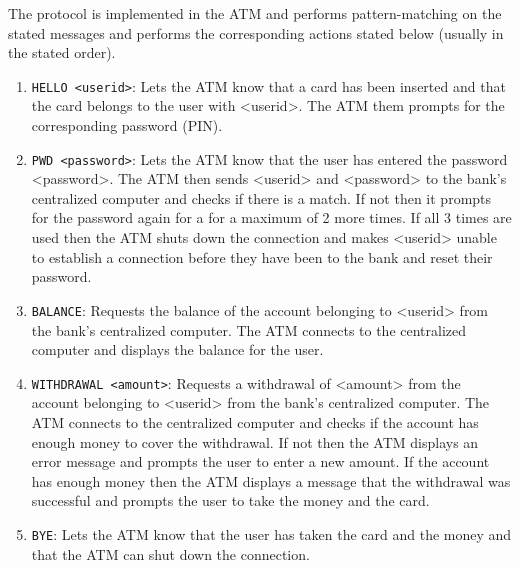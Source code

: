 The protocol is implemented in the ATM and performs pattern-matching on the stated messages and performs the corresponding actions stated below (usually in the stated order).
\begin{enumerate}
    \item \texttt{HELLO <userid>}: Lets the ATM know that a card has been inserted and that the card belongs to the user with <userid>. The ATM them prompts for the corresponding password (PIN).
    \item \texttt{PWD <password>}: Lets the ATM know that the user has entered the password <password>. The ATM then sends <userid> and <password> to the bank's centralized computer and checks if there is a match. If not then it prompts for the password again for a for a maximum of 2 more times. If all 3 times are used then the ATM shuts down the connection and makes <userid> unable to establish a connection before they have been to the bank and reset their password.
    \item \texttt{BALANCE}: Requests the balance of the account belonging to <userid> from the bank's centralized computer. The ATM connects to the centralized computer and displays the balance for the user.
    \item \texttt{WITHDRAWAL <amount>}: Requests a withdrawal of <amount> from the account belonging to <userid> from the bank's centralized computer. The ATM connects to the centralized computer and checks if the account has enough money to cover the withdrawal. If not then the ATM displays an error message and prompts the user to enter a new amount. If the account has enough money then the ATM displays a message that the withdrawal was successful and prompts the user to take the money and the card.
    \item \texttt{BYE}: Lets the ATM know that the user has taken the card and the money and that the ATM can shut down the connection.
\end{enumerate}


